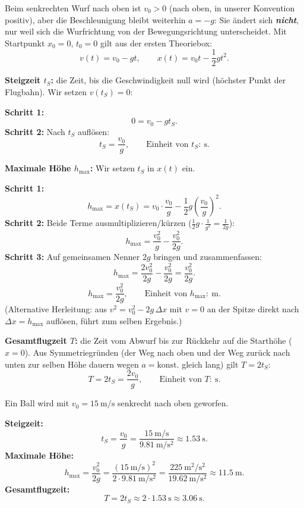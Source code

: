 \documentclass[addpoints,11pt,a4paper]{exam}
\begin{document}
\begin{theoriebox}
Beim senkrechten Wurf nach oben ist $v_0>0$ (nach oben, in unserer
Konvention positiv), aber die Beschleunigung bleibt weiterhin $a=-g$: Sie
ändert sich \textbf{\emph{nicht}}, nur weil sich die Wurfrichtung von der
Bewegungsrichtung unterscheidet. Mit Startpunkt $x_0=0$, $t_0=0$ gilt aus
der ersten Theoriebox:
\[
  v(t) = v_0 - gt, \qquad x(t) = v_0t - \frac{1}{2}gt^2.
\]

\textbf{Steigzeit $t_S$:} die Zeit, bis die Geschwindigkeit null wird
(höchster Punkt der Flugbahn). Wir setzen $v(t_S)=0$:

\textbf{Schritt 1:}
\[
  0 = v_0 - gt_S.
\]
\textbf{Schritt 2:} Nach $t_S$ auflösen:
\[
  \boxed{t_S = \frac{v_0}{g}}, \qquad \text{Einheit von } t_S\colon\ \si{\second}.
\]

\textbf{Maximale Höhe $h_{\max}$:} Wir setzen $t_S$ in $x(t)$ ein.

\textbf{Schritt 1:}
\[
  h_{\max} = x(t_S) = v_0\cdot\frac{v_0}{g} - \frac{1}{2}g\left(\frac{v_0}{g}\right)^2.
\]
\textbf{Schritt 2:} Beide Terme ausmultiplizieren/kürzen
($\frac{1}{2}g\cdot\frac{1}{g^2}=\frac{1}{2g}$):
\[
  h_{\max} = \frac{v_0^2}{g} - \frac{v_0^2}{2g}.
\]
\textbf{Schritt 3:} Auf gemeinsamen Nenner $2g$ bringen und
zusammenfassen:
\[
  h_{\max} = \frac{2v_0^2}{2g} - \frac{v_0^2}{2g} = \frac{v_0^2}{2g}.
\]
\[
  \boxed{h_{\max} = \frac{v_0^2}{2g}}, \qquad \text{Einheit von } h_{\max}\colon\ \si{\meter}.
\]
(Alternative Herleitung: aus $v^2=v_0^2-2g\,\Delta x$ mit $v=0$ an der
Spitze direkt nach $\Delta x=h_{\max}$ auflösen, führt zum selben
Ergebnis.)

\textbf{Gesamtflugzeit $T$:} die Zeit vom Abwurf bis zur Rückkehr auf die
Starthöhe ($x=0$). Aus Symmetriegründen (der Weg nach oben und der Weg
zurück nach unten zur selben Höhe dauern wegen $a=\text{konst.}$ gleich
lang) gilt $T=2t_S$:
\[
  \boxed{T = 2t_S = \frac{2v_0}{g}}, \qquad \text{Einheit von } T\colon\ \si{\second}.
\]

\begin{beispielbox}
Ein Ball wird mit $v_0=\SI{15}{\meter\per\second}$ senkrecht nach oben
geworfen.

\textbf{Steigzeit:}
\[
  t_S = \frac{v_0}{g} = \frac{\SI{15}{\meter\per\second}}{\SI{9.81}{\meter\per\second\squared}} \approx \SI{1.53}{\second}.
\]
\textbf{Maximale Höhe:}
\[
  h_{\max} = \frac{v_0^2}{2g} = \frac{(\SI{15}{\meter\per\second})^2}{2\cdot\SI{9.81}{\meter\per\second\squared}} = \frac{\SI{225}{\meter\squared\per\second\squared}}{\SI{19.62}{\meter\per\second\squared}} \approx \SI{11.5}{\meter}.
\]
\textbf{Gesamtflugzeit:}
\[
  T = 2t_S \approx 2\cdot\SI{1.53}{\second} \approx \SI{3.06}{\second}.
\]
\end{beispielbox}
\end{theoriebox}
\end{document}
